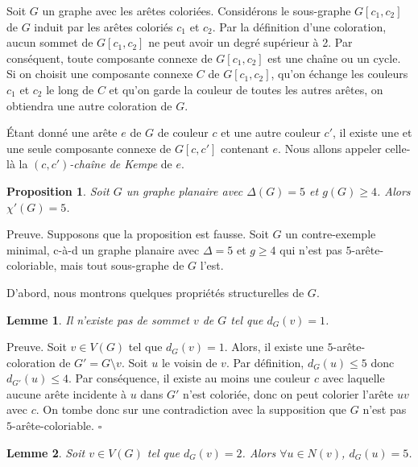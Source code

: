 \documentclass[10pt,a4paper]{article}
\newtheorem{proposition}{Proposition}
\newtheorem{lemme}{Lemme}
\newcommand{\ep}{{\hfill $\square$}}
\begin{document}
Soit $G$ un graphe avec les arêtes coloriées. 
Considérons le sous-graphe $G[c_1,c_2]$ de $G$ induit par les arêtes coloriés $c_1$ et $c_2$. Par la définition d'une coloration, aucun sommet de $G[c_1,c_2]$ ne peut avoir un degré supérieur à 2. Par conséquent, toute composante connexe de $G[c_1,c_2]$ est une chaîne ou un cycle. Si on choisit une composante connexe $C$ de $G[c_1,c_2]$, qu'on échange les couleurs $c_1$ et $c_2$ le long de $C$ et qu'on garde la couleur de toutes les autres arêtes, on obtiendra une autre coloration de $G$.

Étant donné une arête $e$ de $G$ de couleur $c$ et une autre couleur $c'$, il existe une et une seule composante connexe de $G[c,c']$ contenant $e$.
Nous allons appeler celle-là la \emph{$(c,c')$-chaîne de Kempe} de $e$.



\begin{proposition}
Soit $G$ un graphe planaire avec $\Delta(G) = 5$ et $g(G) \geq 4$. Alors $\chi'(G)=5$.
\label{prop:545}
\end{proposition}

Preuve. Supposons que la proposition est fausse. Soit $G$ un contre-exemple minimal, c-à-d un graphe planaire avec $\Delta = 5$ et $g \geq 4$ qui n'est pas $5$-arête-coloriable, mais tout sous-graphe de $G$ l'est.

D'abord, nous montrons quelques propriétés structurelles de $G$.

\begin{lemme}
Il n'existe pas de sommet $v$ de $G$ tel que $d_G(v) = 1$.
\label{le:1}
\end{lemme}

Preuve. Soit $v \in V(G)$ tel que $d_G(v) = 1$. Alors, il existe une $5$-arête-coloration de $G'=G \setminus v$. Soit $u$ le voisin de $v$. Par définition, $d_G(u) \leq 5$ donc $d_{G'}(u) \leq 4$. Par conséquence, il existe au moins une couleur $c$ avec laquelle aucune arête incidente à $u$ dans $G'$ n'est coloriée, donc on peut colorier l'arête $uv$ avec $c$. On tombe donc sur une contradiction avec la supposition que $G$ n'est pas $5$-arête-coloriable.
\ep

\begin{lemme}
Soit $v \in V(G)$ tel que $d_G(v) = 2$. Alors $\forall u \in N(v)$, $d_G(u) = 5$.
\label{le:2}
\end{lemme}
\end{document}
